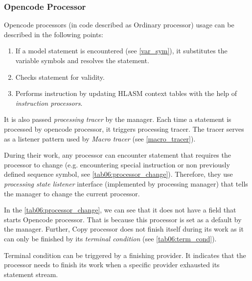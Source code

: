 \subsubsection{Opencode Processor}
\label{ord_proc}
Opencode processors (in code described as Ordinary processor) usage can be described in the following points:
\begin{enumerate}
	\item If a model statement is encountered (see \cref{var_sym}), it substitutes the variable symbols and resolves the statement.
	\item Checks statement for validity.
	\item Performs instruction by updating HLASM context tables with the help of \emph{instruction processors}.
\end{enumerate}

It is also passed \emph{processing tracer} by the manager. Each time a statement is processed by opencode processor, it triggers processing tracer. The tracer serves as a listener pattern used by \emph{Macro tracer} (see \cref{macro_tracer}).

\vspace{0.5cm}

During their work, any processor can encounter statement that requires the processor to change (e.g. encountering special instruction or non previously defined sequence symbol, see \cref{tab06:processor_change}). Therefore, they use \emph{processing state listener} interface (implemented by processing manager) that tells the manager to change the current processor.

In the \cref{tab06:processor_change}, we can see that it does not have a field that starts Opencode processor. That is because this processor is set as a default by the manager. Further, Copy processor does not finish itself during its work as it can only be finished by its \emph{terminal condition} (see \cref{tab06:term_cond}). 

Terminal condition can be triggered by a finishing provider. It indicates that the processor needs to finish its work when a specific provider exhausted its statement stream.

\newcommand{\fin}{\textcolor{red}{finish}}
\newcommand{\strt}[1]{\textcolor{red}{start #1}}
\newcommand{\cont}{\textcolor{LightGreen}{continue}}


